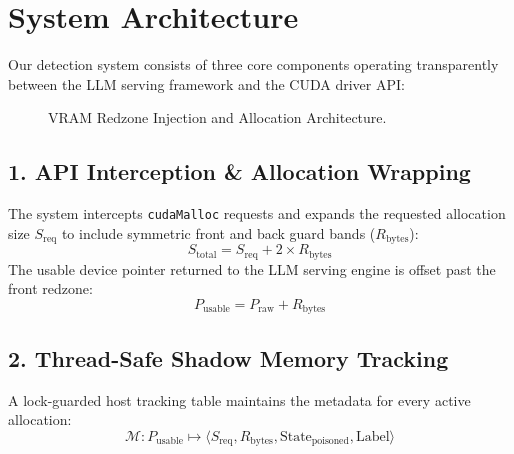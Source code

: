 \documentclass[10pt,twocolumn,a4paper]{article}
\begin{document}
\section{System Architecture}

Our detection system consists of three core components operating transparently between the LLM serving framework and the CUDA driver API:

\begin{figure}[h]
\centering
{}
\caption{VRAM Redzone Injection and Allocation Architecture.}
\label{fig:arch}
\end{figure}

\subsection{1. API Interception \& Allocation Wrapping}
The system intercepts \texttt{cudaMalloc} requests and expands the requested allocation size $S_{\text{req}}$ to include symmetric front and back guard bands ($R_{\text{bytes}}$):
\begin{equation}
S_{\text{total}} = S_{\text{req}} + 2 \times R_{\text{bytes}}
\end{equation}
The usable device pointer returned to the LLM serving engine is offset past the front redzone:
\begin{equation}
P_{\text{usable}} = P_{\text{raw}} + R_{\text{bytes}}
\end{equation}

\subsection{2. Thread-Safe Shadow Memory Tracking}
A lock-guarded host tracking table maintains the metadata for every active allocation:
\begin{equation}
\mathcal{M}: P_{\text{usable}} \mapsto \langle S_{\text{req}}, R_{\text{bytes}}, \text{State}_{\text{poisoned}}, \text{Label} \rangle
\end{equation}
\end{document}

